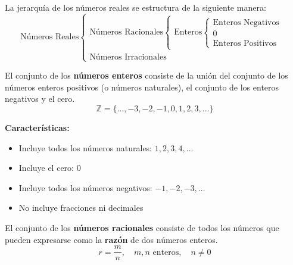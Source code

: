 


\begin{definition}
La jerarquía de los números reales se estructura de la siguiente manera:
$$\text{Números Reales} \begin{cases}
\text{Números Racionales} \begin{cases}
\text{Enteros} \begin{cases}
\text{Enteros Negativos} \\
0 \\
\text{Enteros Positivos}
\end{cases}
\end{cases} \\
\text{Números Irracionales}
\end{cases}$$
\end{definition}


\begin{definition}
El conjunto de los \textbf{números enteros} consiste de la unión del conjunto de los números enteros positivos (o números naturales), el conjunto de los enteros negativos y el cero.
$$\mathbb{Z} = \{\ldots, -3, -2, -1, 0, 1, 2, 3, \ldots\}$$
\end{definition}

\textbf{Características:}
\begin{itemize}
\item Incluye todos los números naturales: $1, 2, 3, 4, \ldots$
\item Incluye el cero: $0$
\item Incluye todos los números negativos: $-1, -2, -3, \ldots$
\item No incluye fracciones ni decimales
\end{itemize}


\begin{definition}
El conjunto de los \textbf{números racionales} consiste de todos los números que pueden expresarse como la \textbf{razón} de dos números enteros.
$$r = \frac{m}{n}, \quad m, n \text{ enteros}, \quad n \neq 0$$
\end{definition}

